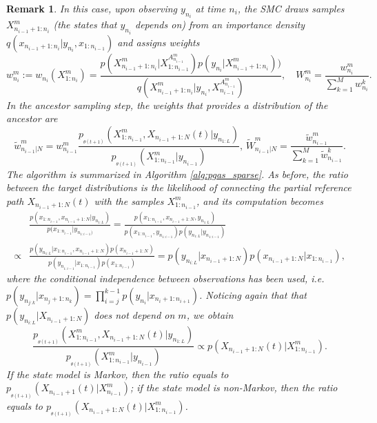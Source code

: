 \documentclass[12pt]{article}
\newtheorem{remark}[theorem]{Remark}
\begin{document}
\begin{remark}
In this case, upon observing $y_{n_i}$ at time $n_{i}$, the SMC draws samples $X^m_{n_{i-1}+1:n_i}$  (the states that $y_{n_i}$ depends on) from an importance density $q(x_{n_{i-1}+1:n_i}|y_{n_i}, x_{1:n_{i-1}})$ and assigns weights 
\begin{equation}  \label{eq:wt_smc_sparse}
w_{n_i}^m:=w_{n_i}(X_{1:n_i}^m)= \frac{p(X_{n_{i-1}+1:n_i}^m|X_{1:n_{i-1}}^{A_{n_{i-1}}^m} )p(y_{n_i}|X_{n_{i-1}+1:n_i}^m))}{q(X_{n_{i-1}+1:n_i}^m|y_{n_i}, X_{n_{i-1}}^{A_{n_{i-1}}^m} )},\quad W_{n_i}^m= \frac{w_{n_i}^m}{\sum_{k=1}^Mw_{n_i}^k}.
\end{equation}
In the ancestor sampling step, the weights that provides a distribution of the ancestor are
\begin{equation}\label{eq:aswt_sparse}
\widetilde{w}_{n_{i-1} |N}^m = w_{n_{i-1}}^m \frac{p_{_{\theta(t+1)}}(X^m_{1:n_{i-1}}, X_{n_{i-1}+1:N}(t)| y_{n_{1:L}})}{p_{_{\theta(t+1)}}(X^m_{1:n_{i-1}}| y_{n_{i-1}})}, \, \widetilde{W}_{n_{i-1}|N}^m = \frac{\widetilde{w}_{n_{i-1}}^m}{\sum_{k=1}^M\widetilde{w}_{n_{i-1}}^k}. 
\end{equation}
The algorithm is summarized in Algorithm \ref{alg:pgas_sparse}.  As before, the ratio between the target distributions is the likelihood of connecting the partial reference path $X_{n_{i-1}+1:N}(t)$ with the samples $X^m_{1:n_{i-1}}$, and its computation becomes 
\begin{align*}
& \frac{p(x_{1:n_{i-1}}, x_{n_{i-1}+1:N}| y_{n_{1:L}})}{p(x_{1:n_{i-1}}| y_{n_{1:i-1})} }= \frac{p(x_{1:n_{i-1}}, x_{n_{i-1}+1:N}, y_{n_{1:L}})}{p(x_{1:n_{i-1}}, y_{n_{1:i-1}}) p(y_{n_{1:L}} | y_{n_{1:i-1}})} \\
\propto &  \frac{p(y_{n_{1:L}} | x_{1:n_{i-1}}, x_{n_{i-1}+1:N}) p(x_{n_{i-1}+1:N})} {p(y_{n_{1:i-1}} | x_{1:n_{i-1}}) p(x_{1:n_{i-1}})} = p(y_{n_{i:L}} | x_{n_{i-1}+1:N}) p(x_{n_{i-1}+1:N} |x_{1:n_{i-1}}), 
\end{align*}
where the conditional independence between observations has been used, i.e. $p(y_{n_{j:k}} | x_{n_j+1:n_k}) = \prod_{i=j}^{k-1} p(y_{n_i}|x_{n_i+1:n_{i+1}} )$. Noticing again that that $p(y_{n_{i:L}} | X_{n_{i-1}+1:N} )$ does not depend on $m$, we obtain  
\[
\frac{p_{_{\theta(t+1)}}(X^m_{1:n_{i-1}}, X_{n_{i-1}+1:N}(t)| y_{n_{1:L}})}{p_{_{\theta(t+1)}}(X^m_{1:n_{i-1}}| y_{n_{i-1}})} \propto p(X_{n_{i-1}+1:N}(t) |X^m_{1:n_{i-1}}). 
\]
If the state model is Markov, then the ratio equals to $p_{_{\theta(t+1)}}(X_{n_{i-1}+1}(t) |X_{n_{i-1}}^m )$; if the state model is non-Markov, then the ratio equals to $p_{_{\theta(t+1)}}(X_{n_{i-1}+1:N}(t) |X_{1:n_{i-1}}^m )$. 
\end{remark}
\end{document}

